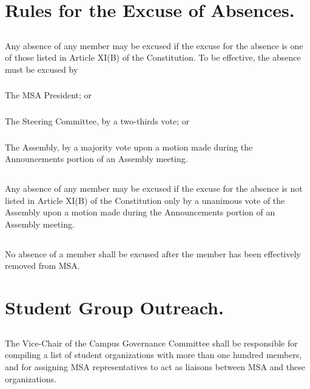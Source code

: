 \documentclass{rules}
\begin{document}
\section{Rules for the Excuse of Absences.}
\subsection{}
Any absence of any member may be excused if the excuse for the absence is one of those listed in Article XI(B) of the Constitution.  To be effective, the absence must be excused by
\subsubsection{}
The MSA President; or
\subsubsection{}
The Steering Committee, by a two-thirds vote; or
\subsubsection{}
The Assembly, by a majority vote upon a motion made during the Announcements portion of an Assembly meeting.
\subsection{}
Any absence of any member may be excused if the excuse for the absence is not listed in Article XI(B) of the Constitution only by a unanimous vote of the Assembly upon a motion made during the Announcements portion of an Assembly meeting.
\subsection{}
No absence of a member shall be excused after the member has been effectively removed from MSA.

\section{Student Group Outreach.}
\subsection{}
The Vice-Chair of the Campus Governance Committee shall be responsible for compiling a list of student organizations with more than one hundred members, and for assigning MSA representatives to act as liaisons between MSA and these organizations.
\end{document}
